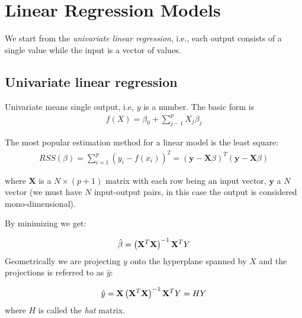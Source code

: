 
\section{Linear Regression Models}
We start from the \textit{univariate linear regression}, i.e., each output consists of a single value while the input is a vector of values.

\subsection{Univariate linear regression}
Univariate means single output, i.e, $y$ is a number. The basic form is 
\begin{align}
f(X) = \beta_0 + \sum_{j-1}^p X_j \beta_j
\end{align}

The most popular estimation method for a linear model is the least square:
\begin{align}
RSS(\beta) = \sum_{i=1}^{p}  \left( y_i - f(x_i) \right)^2 = \left(\bm{y} - \bm{X}\beta\right)^T \left(\bm{y} - \bm{X}\beta\right)
\end{align}

where $\bm{X}$ is a $N \times (p+1)$ matrix with each row being an input vector, $\bm{y}$ a $N$ vector (we must have $N$ input-output pairs, in this case the output is considered mono-dimensional).

By minimizing we get:

\begin{align}
\hat{\beta} = \left( \mathrm{\mathbf{X}}^T \mathrm{\mathbf{X}}\right)^{-1} \mathrm{\mathbf{X}}^TY
\label{OLSRegression}
\end{align}
Geometrically we are projecting $y$ onto the hyperplane spanned by $X$ and the projections is referred to as $\hat{y}$:

\begin{align}
\hat{y} =\mathrm{\mathbf{X}} \left( \mathrm{\mathbf{X}}^T \mathrm{\mathbf{X}}\right)^{-1} \mathrm{\mathbf{X}}^T Y = H Y
\end{align}
where $H$ is called the \textit{hat} matrix.


